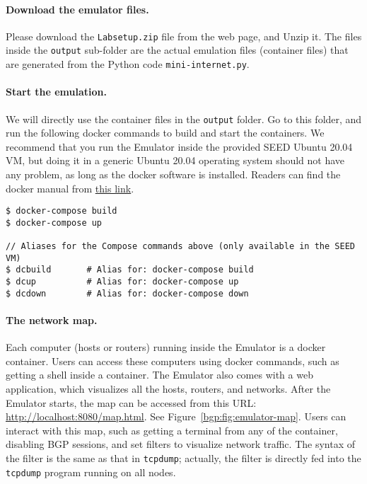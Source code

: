 \paragraph{Download the emulator files.}
Please download the \texttt{Labsetup.zip} file from the web page, and 
Unzip it. The files inside the \texttt{output} sub-folder are the actual
emulation files (container files) that are
generated from the Python code \texttt{mini-internet.py}.


\paragraph{Start the emulation.}
We will directly use the container files in the \texttt{output} folder. 
Go to this folder, and run the following docker commands
to build and start the containers. We recommend that you run the Emulator inside
the provided SEED Ubuntu 20.04 VM, but doing it in a generic Ubuntu 20.04 operating system
should not have any problem, as long as the docker software is installed. 
Readers can find the docker manual from 
\href{https://github.com/seed-labs/seed-labs/blob/master/manuals/docker/SEEDManual-Container.md}
{\underline{this link}}.

\begin{lstlisting}
$ docker-compose build
$ docker-compose up

// Aliases for the Compose commands above (only available in the SEED VM)
$ dcbuild       # Alias for: docker-compose build
$ dcup          # Alias for: docker-compose up
$ dcdown        # Alias for: docker-compose down
\end{lstlisting}

\paragraph{The network map.}
Each computer (hosts or routers) running inside the Emulator is a docker container.
Users can access these computers using docker commands, such as getting a shell
inside a container.
The Emulator also comes with a web application, which visualizes all the hosts, routers,
and networks.
After the Emulator starts, the map can be accessed from this
URL: \url{http://localhost:8080/map.html}.
See Figure~\ref{bgp:fig:emulator-map}.
Users can interact with this map, such as getting a terminal from any of the container,
disabling BGP sessions, and set filters to visualize network traffic.
The syntax of the filter is the same as that in \texttt{tcpdump}; actually,
the filter is directly fed into the \texttt{tcpdump} program running on all nodes.

